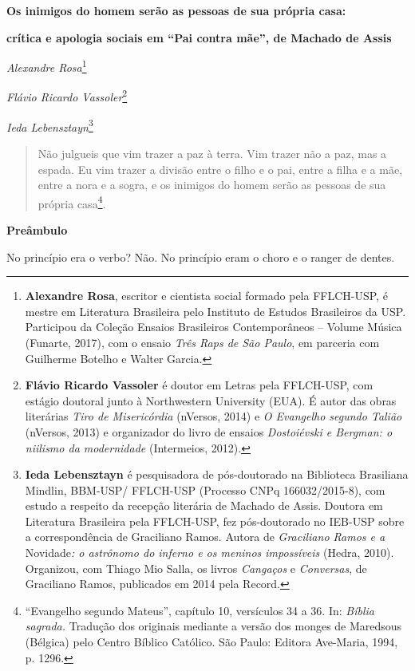 \textbf{Os inimigos do homem serão as pessoas de sua própria casa:}

\textbf{crítica e apologia sociais em ``Pai contra mãe'', de Machado de
Assis}

\emph{Alexandre Rosa}\footnote{\textbf{Alexandre Rosa}, escritor e
  cientista social formado pela FFLCH-USP, é mestre em Literatura
  Brasileira pelo Instituto de Estudos Brasileiros da USP. Participou da
  Coleção Ensaios Brasileiros Contemporâneos -- Volume Música (Funarte,
  2017), com o ensaio \emph{Três Raps de São Paulo}, em parceria com
  Guilherme Botelho e Walter Garcia.}

\emph{Flávio Ricardo Vassoler}\footnote{\textbf{Flávio Ricardo Vassoler}
  é doutor em Letras pela FFLCH-USP, com estágio doutoral junto à
  Northwestern University (EUA). É autor das obras literárias \emph{Tiro
  de Misericórdia} (nVersos, 2014) e \emph{O Evangelho segundo Talião}
  (nVersos, 2013) e organizador do livro de ensaios \emph{Dostoiévski e
  Bergman: o niilismo da modernidade} (Intermeios, 2012).}

\emph{Ieda Lebensztayn}\footnote{\textbf{Ieda Lebensztayn} é
  pesquisadora de pós-doutorado na Biblioteca Brasiliana Mindlin,
  BBM-USP/ FFLCH-USP (Processo CNPq 166032/2015-8), com estudo a
  respeito da recepção literária de Machado de Assis. Doutora em
  Literatura Brasileira pela FFLCH-USP, fez pós-doutorado no IEB-USP
  sobre a correspondência de Graciliano Ramos. Autora de
  \emph{Graciliano Ramos e a} Novidade\emph{: o astrônomo do inferno e
  os meninos impossíveis} (Hedra, 2010). Organizou, com Thiago Mio
  Salla, os livros \emph{Cangaços} e \emph{Conversas}, de Graciliano
  Ramos, publicados em 2014 pela Record.}

\begin{quote}
Não julgueis que vim trazer a paz à terra. Vim trazer não a paz, mas a
espada. Eu vim trazer a divisão entre o filho e o pai, entre a filha e a
mãe, entre a nora e a sogra, e os inimigos do homem serão as pessoas de
sua própria casa\footnote{``Evangelho segundo Mateus'', capítulo 10,
  versículos 34 a 36. In: \emph{Bíblia sagrada.} Tradução dos originais
  mediante a versão dos monges de Maredsous (Bélgica) pelo Centro
  Bíblico Católico. São Paulo: Editora Ave-Maria, 1994, p. 1296.}.
\end{quote}

\textbf{Preâmbulo}

No princípio era o verbo? Não. No princípio eram o choro e o ranger de
dentes.

